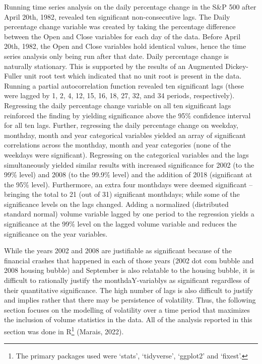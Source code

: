\documentclass[11pt,preprint, authoryear]{elsarticle}
\numberwithin{equation}{section}
\numberwithin{figure}{section}
\numberwithin{table}{section}
\let\rmarkdownfootnote\footnote%
\def\footnote{\protect\rmarkdownfootnote}
\begin{document}
Running time series analysis on the daily percentage change in the S\&P
500 after April 20th, 1982, revealed ten significant non-consecutive
lags. The Daily percentage change variable was created by taking the
percentage difference between the Open and Close variables for each day
of the data. Before April 20th, 1982, the Open and Close variables hold
identical values, hence the time series analysis only being run after
that date. Daily percentage change is naturally stationary. This is
supported by the results of an Augmented Dickey-Fuller unit root test
which indicated that no unit root is present in the data. Running a
partial autocorrelation function revealed ten significant lags (these
were lagged by 1, 2, 4, 12, 15, 16, 18, 27, 32, and 34 periods,
respectively). Regressing the daily percentage change variable on all
ten significant lags reinforced the finding by yielding significance
above the 95\% confidence interval for all ten lags. Further, regressing
the daily percentage change on weekday, monthday, month and year
categorical variables yielded an array of significant correlations
across the monthday, month and year categories (none of the weekdays
were significant). Regressing on the categorical variables and the lags
simultaneously yielded similar results with increased significance for
2002 (to the 99\% level) and 2008 (to the 99.9\% level) and the addition
of 2018 (significant at the 95\% level). Furthermore, an extra four
monthdays were deemed significant -- bringing the total to 21 (out of
31) significant monthdays; while some of the significance levels on the
lags changed. Adding a normalized (distributed standard normal) volume
variable lagged by one period to the regression yields a significance at
the 99\% level on the lagged volume variable and reduces the
significance on the year variables.

While the years 2002 and 2008 are justifiable as significant because of
the financial crashes that happened in each of those years (2002 dot com
bubble and 2008 housing bubble) and September is also relatable to the
housing bubble, it is difficult to rationally justify the
monthdaY-variablys as significant regardless of their quantitative
significance. The high number of lags is also difficult to justify and
implies rather that there may be persistence of volatility. Thus, the
following section focuses on the modelling of volatility over a time
period that maximizes the inclusion of volume statistics in the data.
All of the analysis reported in this section was done in R\footnote{The
  primary packages used were `stats', `tidyverse', `ggplot2' and
  `fixest'.} (Marais, 2022).
\end{document}
